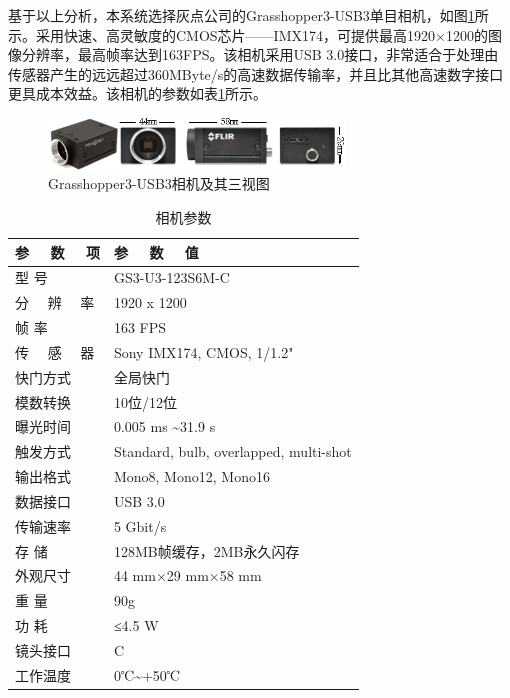 基于以上分析，本系统选择灰点公司的Grasshopper3-USB3单目相机，如图\ref{fig2_8}所示。采用快速、高灵敏度的CMOS芯片——IMX174，可提供最高1920×1200的图像分辨率，最高帧率达到163FPS。该相机采用USB 3.0接口，非常适合于处理由传感器产生的远远超过360MByte/s的高速数据传输率，并且比其他高速数字接口更具成本效益。该相机的参数如表\ref{tab2.1}所示。
\begin{figure}[h]\setlength{\belowcaptionskip}{8pt}
	\centering
	\includegraphics[width=0.7\textwidth]{figures/chapter2/fig2_8}
	\caption{Grasshopper3-USB3相机及其三视图}\label{fig2_8}
\end{figure}
\begin{table}\setlength{\belowcaptionskip}{-12pt}
	\centering
	\caption{相机参数} \label{tab2.1}
	\begin{tabular}{m{}<{\centering} m{}<{\centering}}%
		\toprule
		参 \ \  数 \ \  项        &参 \ \  数 \ \  值       \\
		\midrule
		型 \quad\quad 号			&GS3-U3-123S6M-C	 \\
		分 \ \  辨 \ \  率	       &1920 x 1200         \\
		帧 \quad\quad 率	    	&163 FPS	         \\
		传 \ \  感 \ \  器	   &Sony IMX174, CMOS, 1/1.2"	 \\
		快门方式	              &全局快门             \\
		模数转换                  &10位/12位           \\
		曝光时间                  &0.005 ms \textasciitilde 31.9 s   \\
		触发方式                  &Standard, bulb, overlapped, multi-shot \\
		输出格式                  &Mono8, Mono12, Mono16\\
		数据接口                  &USB 3.0                \\
		传输速率                  &5 Gbit/s                \\
		存 \quad\quad 储          &128MB帧缓存，2MB永久闪存    \\
		外观尺寸                  &44 mm×29 mm×58 mm        \\
		重 \quad\quad 量          &90g                    \\
		功 \quad\quad 耗          &≤4.5 W                 \\
		镜头接口                  &C                      \\
		工作温度 	              &0℃\textasciitilde+50℃               \\
		\bottomrule
	\end{tabular}
\end{table}

